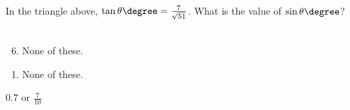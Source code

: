  \begin{center}
\end{center}
In the triangle above, $\tan \theta\degree = \frac{7}{\sqrt{51}}$.  What is the value of $\sin \theta\degree$?\\\\


\ifsat
	\begin{enumerate}[label=\Alph*)]
	\end{enumerate}
\else
\fi

\ifacteven
	\begin{enumerate}[label=\textbf{\Alph*.},itemsep=\fill,align=left]
		\setcounter{enumii}{5}
		\item None of these. 
	\end{enumerate}
\else
\fi

\ifactodd
	\begin{enumerate}[label=\textbf{\Alph*.},itemsep=\fill,align=left]
		\item None of these. 
	\end{enumerate}
\else
\fi

\ifgridin
$0.7 $ or $\frac{7}{10}$
\else
\fi

